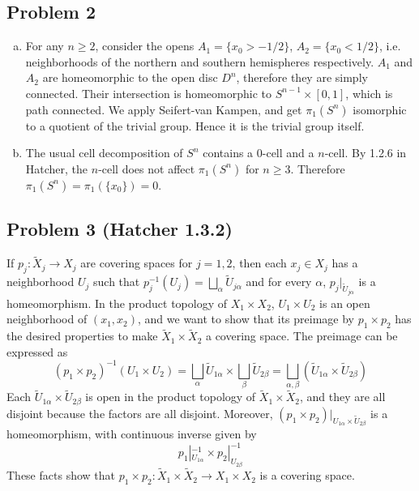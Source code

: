 \documentclass[12 pt]{article}
\begin{document}
\subsection*{Problem 2}
\begin{enumerate}[(a)]
\item For any $n\geq 2$, consider the opens $A_1 = \{ x_0 > - 1/2\}$, $A_2 = \{x_0 < 1/2\}$, i.e. neighborhoods of the northern and southern hemispheres respectively. $A_1$ and $A_2$ are homeomorphic to the open disc $D^n$, therefore they are simply connected. Their intersection is homeomorphic to $S^{n-1} \times [0,1]$, which is path connected. We apply Seifert-van Kampen, and get $\pi_1(S^n)$ isomorphic to a quotient of the trivial group. Hence it is the trivial group itself.
\item The usual cell decomposition of $S^n$ contains a 0-cell and a $n$-cell. By 1.2.6 in Hatcher, the $n$-cell does not affect $\pi_1(S^n)$ for $n\geq 3$. Therefore $\pi_1(S^n) = \pi_1(\{x_0\}) = 0$.
\end{enumerate}


\subsection*{Problem 3 (Hatcher 1.3.2)}
If $p_j : \tilde X_j \to X_j$ are covering spaces for $j = 1,2$, then each $x_j \in X_j$ has a neighborhood $U_j$ such that $p_j^{-1}(U_j) = \bigsqcup_{\alpha} \tilde U_{j\alpha}$ and for every $\alpha$, $p_j |_{\tilde U_{j\alpha}}$ is a homeomorphism. In the product topology of $X_1 \times X_2$, $U_1 \times U_2$ is an open neighborhood of $(x_1, x_2)$, and we want to show that its preimage by $p_1 \times p_2$ has the desired properties to make $\tilde X_1 \times \tilde X_2$ a covering space. The preimage can be expressed as
\[      (p_1 \times p_2)^{-1} (U_1 \times U_2) =  \bigsqcup_{\alpha} \tilde U_{1\alpha}  \times \bigsqcup_{\beta} \tilde U_{2\beta}  = \bigsqcup_{\alpha, \beta} (\tilde U_{1\alpha} \times \tilde U_{2\beta}) \]
Each $\tilde U_{1\alpha} \times \tilde U_{2\beta}$ is open in the product topology of $\tilde X_1 \times \tilde X_2$, and they are all disjoint because the factors are all disjoint. Moreover, $(p_1 \times p_2)|_{U_{1\alpha} \times \tilde U_{2\beta}}$ is a homeomorphism, with continuous inverse given by
\[       p_1|_{U_{1\alpha}}^{-1} \times p_2|_{U_{2\beta}}^{-1}    \]
These facts show that $p_1 \times p_2 : \tilde X_1 \times \tilde X_2 \to X_1 \times X_2$ is a covering space.
\end{document}
